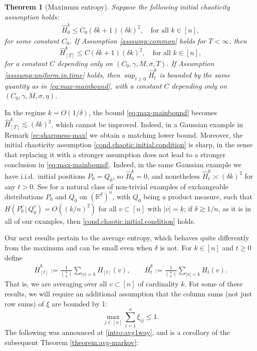 \documentclass[11pt,reqno]{amsart}
\numberwithin{equation}{section}
\newtheorem{theorem}{Theorem}[section]
\theoremstyle{definition}
\def\R{{\mathbb R}}
\begin{document}
\begin{theorem}[Maximum entropy] \label{theorem:max}
Suppose the following initial chaoticity assumption holds:
\begin{align} \label{cond.chaotic.initial.condition}
\widehat{H}^{k}_0 \leq C_0 (\delta k + 1)(\delta k)^2, \quad \text{for all } k \in [n],
\end{align}
for some   constant $C_0$.
If Assumption \ref{asssump:common} holds for $T < \infty$, then 
\begin{equation} \label{eq:max-mainbound}
\widehat{H}^{k}_{[T]} \le C (\delta k + 1)(\delta k)^2, \quad \text{for all } k \in [n],
\end{equation}
for a constant  $C$ depending only on $(C_0, \gamma, M,\sigma, T)$. 
If Assumption \ref{asssump:uniform.in.time} holds, then $\sup_{t \ge 0}\widehat{H}^{k}_t$ is bounded by the same quantity as in \eqref{eq:max-mainbound}, with a constant  $C$ depending only on $(C_0, \gamma, M,\sigma, \eta)$. 
\end{theorem}


In the regime $k=O(1/\delta)$, the bound \eqref{eq:max-mainbound} becomes $\widehat{H}^{k}_{[T]}  \lesssim (\delta k)^2$, which cannot be improved. Indeed, in a Gaussian example in Remark \ref{re:sharpness-max} we obtain a matching lower bound.
Moreover, the initial chaoticity assumption \eqref{cond.chaotic.initial.condition} is sharp, in the sense that replacing it with a stronger assumption does not lead to a stronger conclusion in \eqref{eq:max-mainbound}. Indeed, in the same Gaussian example we have i.i.d.\ initial positions $P_0=Q_0$, so $\widehat{H}^{k}_0=0$, and nonetheless $\widehat{H}^{k}_t \asymp (\delta k)^2$ for any $t > 0$.
See \cite{lacker2022quantitative} for a natural class of non-trivial examples of exchangeable distributions $P_0$ and $Q_0$ on $(\R^d)^n$, with $Q_0$ being a product measure, such that $H(P_0^v \,|\,Q_0^v) = O((k/n)^2)$ for all $v \subset [n]$ with $|v|=k$; if $\delta \gtrsim 1/n$, as it is in all of our examples, then \eqref{cond.chaotic.initial.condition} holds.


Our next results pertain to the average entropy, which behaves quite differently from the maximum and can be small even when $\delta$ is not.
For $k \in [n]$ and $t \ge 0$ define
\begin{align*}
	\overline{H}^{k}_{[t]} := \frac{1}{\binom{n}{k}} \sum_{|v|=k} H_{[t]}(v), \qquad \overline{H}^k_t := \frac{1}{\binom{n}{k}} \sum_{|v|=k} H_t(v).
\end{align*}  
That is, we are averaging over all $v \subset [n]$ of cardinality $k$. 
For some of these results, we will require an additional assumption that the column sums (not just row sums) of $\xi$ are bounded by 1:
\begin{equation} \tag{columns}
\max_{j \in [n]}\sum_{i=1}^n \xi_{ij}\le 1. \label{asmp:columnsum}
\end{equation}
The following was announced at \eqref{intro:avg1way}, and is a corollary of the subsequent Theorem \ref{theorem:avg-markov}:
\end{document}
